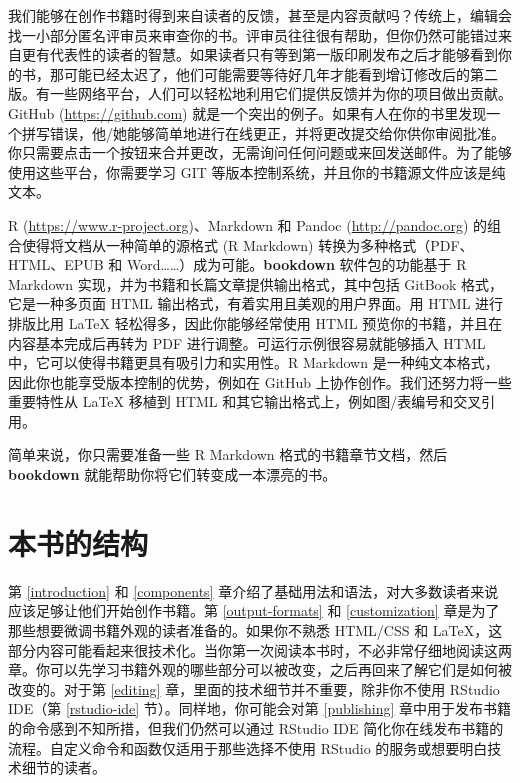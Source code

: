 \documentclass[
  12pt,
]{krantz}
\theoremstyle{definition}
\theoremstyle{definition}
\theoremstyle{definition}
\theoremstyle{definition}
\theoremstyle{remark}
\begin{document}
我们能够在创作书籍时得到来自读者的反馈，甚至是内容贡献吗？传统上，编辑会找一小部分匿名评审员来审查你的书。评审员往往很有帮助，但你仍然可能错过来自更有代表性的读者的智慧。如果读者只有等到第一版印刷发布之后才能够看到你的书，那可能已经太迟了，他们可能需要等待好几年才能看到增订修改后的第二版。有一些网络平台，人们可以轻松地利用它们提供反馈并为你的项目做出贡献。GitHub (\url{https://github.com}) 就是一个突出的例子。如果有人在你的书里发现一个拼写错误，他/她能够简单地进行在线更正，并将更改提交给你供你审阅批准。你只需要点击一个按钮来合并更改，无需询问任何问题或来回发送邮件。为了能够使用这些平台，你需要学习 GIT 等版本控制系统，并且你的书籍源文件应该是纯文本。

R (\url{https://www.r-project.org})、Markdown 和 Pandoc (\url{http://pandoc.org}) 的组合使得将文档从一种简单的源格式 (R Markdown) 转换为多种格式（PDF、HTML、EPUB 和 Word\ldots\ldots）成为可能。\textbf{bookdown} 软件包的功能基于 R Markdown 实现，并为书籍和长篇文章提供输出格式，其中包括 GitBook 格式，它是一种多页面 HTML 输出格式，有着实用且美观的用户界面。用 HTML 进行排版比用 LaTeX 轻松得多，因此你能够经常使用 HTML 预览你的书籍，并且在内容基本完成后再转为 PDF 进行调整。可运行示例很容易就能够插入 HTML 中，它可以使得书籍更具有吸引力和实用性。R Markdown 是一种纯文本格式，因此你也能享受版本控制的优势，例如在 GitHub 上协作创作。我们还努力将一些重要特性从 LaTeX 移植到 HTML 和其它输出格式上，例如图/表编号和交叉引用。

简单来说，你只需要准备一些 R Markdown 格式的书籍章节文档，然后 \textbf{bookdown} 就能帮助你将它们转变成一本漂亮的书。

\section*{本书的结构}\label{ux672cux4e66ux7684ux7ed3ux6784}


第 \ref{introduction} 和 \ref{components} 章介绍了基础用法和语法，对大多数读者来说应该足够让他们开始创作书籍。第 \ref{output-formats} 和 \ref{customization} 章是为了那些想要微调书籍外观的读者准备的。如果你不熟悉 HTML/CSS 和 LaTeX，这部分内容可能看起来很技术化。当你第一次阅读本书时，不必非常仔细地阅读这两章。你可以先学习书籍外观的哪些部分可以被改变，之后再回来了解它们是如何被改变的。对于第 \ref{editing} 章，里面的技术细节并不重要，除非你不使用 RStudio IDE（第 \ref{rstudio-ide} 节）。同样地，你可能会对第 \ref{publishing} 章中用于发布书籍的命令感到不知所措，但我们仍然可以通过 RStudio IDE 简化你在线发布书籍的流程。自定义命令和函数仅适用于那些选择不使用 RStudio 的服务或想要明白技术细节的读者。
\end{document}

